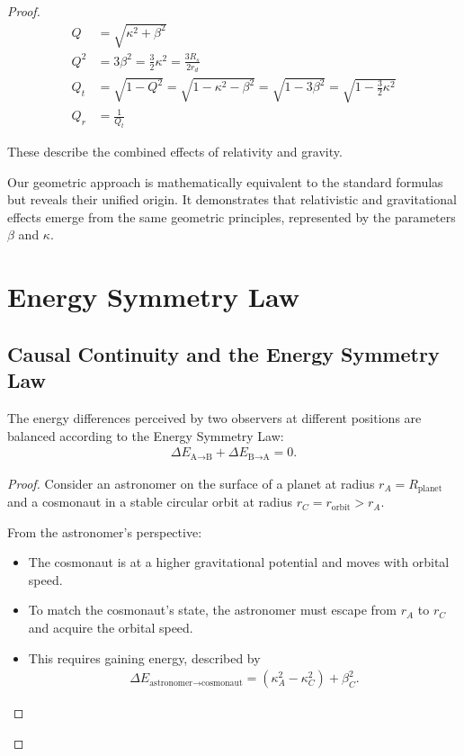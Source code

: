 \documentclass{article}
\begin{document}
\begin{proof}
\begin{align}
    Q &=\sqrt{\kappa^2 + \beta^2}  \\
    Q^{2}&= 3\beta^2 = \frac{3}{2}\kappa^2 = \frac{3R_s}{2r_{d}} \\
    Q_t &= \sqrt{1-Q^2} = \sqrt{1-\kappa^2-\beta^2} = \sqrt{1-3\beta^2} = \sqrt{1-\frac{3}{2}\kappa^2} \\
    Q_r &= \frac{1}{Q_t}
\end{align}

These describe the combined effects of relativity and gravity.

\begin{tcolorbox}[colback=gray!5, colframe=black!80!black, title=Unified Interpretation]
Our geometric approach is mathematically equivalent to the standard formulas but reveals their unified origin. It demonstrates that relativistic and gravitational effects emerge from the same geometric principles, represented by the parameters $\beta$ and $\kappa$.
\end{tcolorbox}


\section{Energy Symmetry Law}

\subsection{Causal Continuity and the Energy Symmetry Law}

\begin{theorem}
The energy differences perceived by two observers at different positions are balanced according to the Energy Symmetry Law:
\begin{align}
\Delta E_{\text{A}\rightarrow\text{B}} + \Delta E_{\text{B}\rightarrow\text{A}} = 0.
\end{align}
\end{theorem}

\begin{proof}
Consider an astronomer on the surface of a planet at radius $r_A = R_{\text{planet}}$ and a cosmonaut in a stable circular orbit at radius $r_C = r_{\text{orbit}} > r_A$.

From the astronomer's perspective:
\begin{itemize}
\item The cosmonaut is at a higher gravitational potential and moves with orbital speed.
\item To match the cosmonaut's state, the astronomer must escape from $r_A$ to $r_C$ and acquire the orbital speed.
\item This requires gaining energy, described by
\begin{align}
\Delta E_{\text{astronomer}\rightarrow\text{cosmonaut}} = (\kappa^2_A - \kappa^2_C) + \beta^2_C.
\end{align}
\end{itemize}


\end{proof}
\end{proof}
\end{document}
